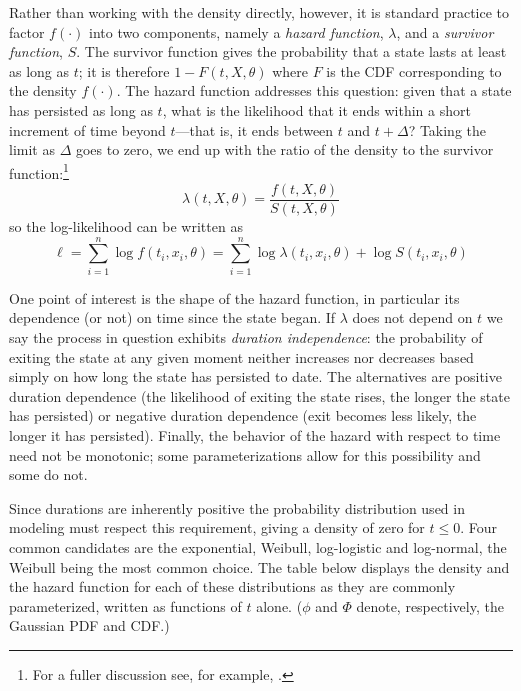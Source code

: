 Rather than working with the density directly, however, it is standard
practice to factor $f(\cdot)$ into two components, namely a
\emph{hazard function}, $\lambda$, and a \emph{survivor function},
$S$.  The survivor function gives the probability that a state lasts
at least as long as $t$; it is therefore $1 - F(t, X, \theta)$ where
$F$ is the CDF corresponding to the density $f(\cdot)$. The hazard
function addresses this question: given that a state has persisted as
long as $t$, what is the likelihood that it ends within a short
increment of time beyond $t$---that is, it ends between $t$ and $t +
\Delta$?  Taking the limit as $\Delta$ goes to zero, we end up with
the ratio of the density to the survivor function:\footnote{For a
  fuller discussion see, for example, \cite{davidson-mackinnon04}.}
\begin{equation}
\label{eq:surv-decomp}
\lambda(t, X, \theta) = \frac{f(t, X, \theta)}{S(t, X, \theta)}
\end{equation}
so the log-likelihood can be written as
\begin{equation}
\label{eq:surv-loglik}
\ell = \sum_{i=1}^n \log f(t_i, x_i, \theta) = 
\sum_{i=1}^n \log \lambda(t_i, x_i, \theta) + 
\log S(t_i, x_i, \theta)
\end{equation}

One point of interest is the shape of the hazard function, in
particular its dependence (or not) on time since the state began.  If
$\lambda$ does not depend on $t$ we say the process in question exhibits
\emph{duration independence}: the probability of exiting the state at
any given moment neither increases nor decreases based simply on how
long the state has persisted to date. The alternatives are positive
duration dependence (the likelihood of exiting the state rises, the
longer the state has persisted) or negative duration dependence (exit
becomes less likely, the longer it has persisted).  Finally, the
behavior of the hazard with respect to time need not be monotonic;
some parameterizations allow for this possibility and some do not.

Since durations are inherently positive the probability distribution
used in modeling must respect this requirement, giving a density of
zero for $t \leq 0$.  Four common candidates are the exponential,
Weibull, log-logistic and log-normal, the Weibull being the most
common choice. The table below displays the density and the hazard
function for each of these distributions as they are commonly
parameterized, written as functions of $t$ alone. ($\phi$ and $\Phi$
denote, respectively, the Gaussian PDF and CDF.)

